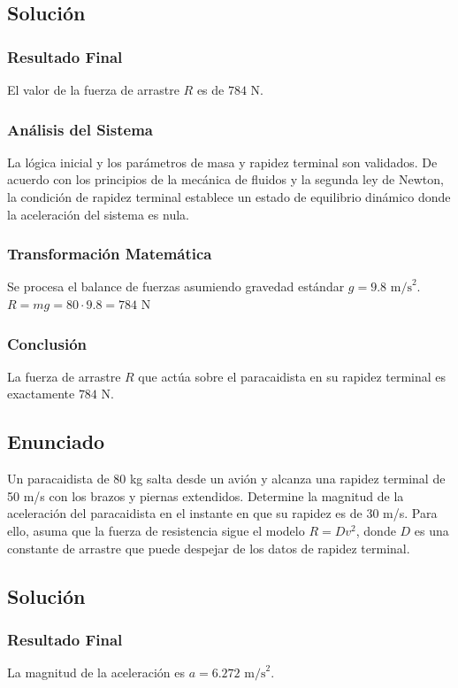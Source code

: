 \documentclass[12pt]{article}
\begin{document}
\subsection*{Solución}

\subsubsection*{Resultado Final}
El valor de la fuerza de arrastre $R$ es de $784\text{ N}$.

\subsubsection*{Análisis del Sistema}
La lógica inicial y los parámetros de masa y rapidez terminal son validados. De acuerdo con los principios de la mecánica de fluidos y la segunda ley de Newton, la condición de rapidez terminal establece un estado de equilibrio dinámico donde la aceleración del sistema es nula.

\subsubsection*{Transformación Matemática}
Se procesa el balance de fuerzas asumiendo gravedad estándar $g = 9.8\text{ m/s}^2$.
$R = mg = 80 \cdot 9.8 = 784\text{ N}$

\subsubsection*{Conclusión}
La fuerza de arrastre $R$ que actúa sobre el paracaidista en su rapidez terminal es exactamente $784\text{ N}$.

\subsection*{Enunciado}
Un paracaidista de 80 kg salta desde un avión y alcanza una rapidez terminal de 50 m/s con los brazos y piernas extendidos. Determine la magnitud de la aceleración del paracaidista en el instante en que su rapidez es de 30 m/s. Para ello, asuma que la fuerza de resistencia sigue el modelo $R = Dv^2$, donde $D$ es una constante de arrastre que puede despejar de los datos de rapidez terminal.

\subsection*{Solución}

\subsubsection*{Resultado Final}
La magnitud de la aceleración es $a = 6.272\text{ m/s}^2$.
\end{document}
